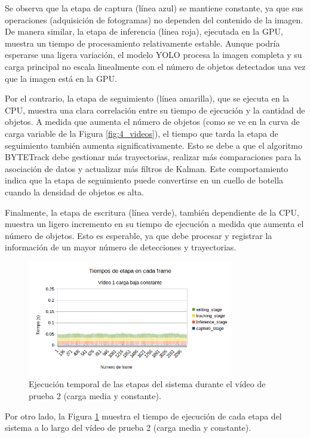 \documentclass[11pt,spanish,listoffigures,listoftables]{tfgetsinf}
\begin{document}
Se observa que la etapa de captura (línea azul) se mantiene constante, ya que sus operaciones (adquisición de fotogramas) no dependen del contenido de la imagen. De manera similar, la etapa de inferencia (línea roja), ejecutada en la GPU, muestra un tiempo de procesamiento relativamente estable. Aunque podría esperarse una ligera variación, el modelo YOLO procesa la imagen completa y su carga principal no escala linealmente con el número de objetos detectados una vez que la imagen está en la GPU.

Por el contrario, la etapa de seguimiento (línea amarilla), que se ejecuta en la CPU, muestra una clara correlación entre su tiempo de ejecución y la cantidad de objetos. A medida que aumenta el número de objetos (como se ve en la curva de carga variable de la Figura \ref{fig:4_videos}), el tiempo que tarda la etapa de seguimiento también aumenta significativamente. Esto se debe a que el algoritmo BYTETrack debe gestionar más trayectorias, realizar más comparaciones para la asociación de datos y actualizar más filtros de Kalman. Este comportamiento indica que la etapa de seguimiento puede convertirse en un cuello de botella cuando la densidad de objetos es alta.

Finalmente, la etapa de escritura (línea verde), también dependiente de la CPU, muestra un ligero incremento en su tiempo de ejecución a medida que aumenta el número de objetos. Esto es esperable, ya que debe procesar y registrar la información de un mayor número de detecciones y trayectorias.


\begin{figure}[H]
   \centering
   \includegraphics[width=0.8\textwidth]{images/analisis_de_la_solucion/tiempos_etapa_video1.png}
   \caption{Ejecución temporal de las etapas del sistema durante el vídeo de prueba 2 (carga media y constante).}
   \label{fig:tiempos_etapa_video1}
\end{figure}

Por otro lado, la Figura \ref{fig:tiempos_etapa_video1} muestra el tiempo de ejecución de cada etapa del sistema a lo largo del vídeo de prueba 2 (carga media y constante).
\end{document}

